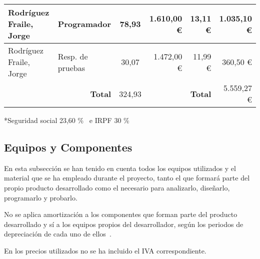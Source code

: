 \begin{table}[H]
{\begin{tabular}{ll|c|rr|r|}
			\multicolumn{1}{|l|}{Rodríguez Fraile, Jorge}                             & Programador                                                 & 78,93                                   & \multicolumn{1}{r|}{1.610,00 €}                              & 13,11 €                                                                              & 1.035,10 €                                                                           \\ \hline
			\multicolumn{1}{|l|}{Rodríguez Fraile, Jorge}                             & Resp. de pruebas                                            & 30,07                                   & \multicolumn{1}{r|}{1.472,00 €}                              & 11,99 €                                                                              & 360,50   €                                                                           \\ \hline
			                                                                          & \multicolumn{1}{r|}{\textbf{Total}}                         & 324,93                                  & \multicolumn{1}{l}{}                                         & \textbf{Total}                                                                       & 5.559,27 €                                                                           \\ \cline{3-3} \cline{6-6}
		\end{tabular}%
	}
\end{table}

*Seguridad social 23,60 \%~\cite{noauthor_seguridad_nodate} e IRPF 30 \%~\cite{trecet_irpf_nodate}

\subsection{Equipos y Componentes}\label{subsec:equipos-y-componentes}
En esta subsección se han tenido en cuenta todos los equipos utilizados y el material que se ha empleado durante el proyecto, tanto el que formará parte del propio producto desarrollado como el necesario para analizarlo, diseñarlo, programarlo y probarlo.

No se aplica amortización a los componentes que forman parte del producto desarrollado y sí a los equipos propios del desarrollador, según los periodos de depreciación de cada uno de ellos~\cite{thiebaud_-muller_service_2018}.

En los precios utilizados no se ha incluido el IVA correspondiente.

